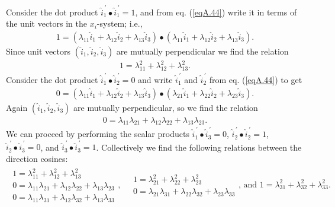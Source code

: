\documentclass{AeroStructure-ERJohnson}
\begin{document}
Consider the dot product $\hat{i}_{1}^{\,\prime} \bullet \hat{i}_{1}^{\,\prime}=1$, and from eq. (\ref{eqA.44}) write it in terms of the unit vectors in the $x_{i}$-system; i.e.,
\begin{align}\label{eqA.45}
1=(\lambda_{11} \hat{i}_{1}+\lambda_{12} \hat{i}_{2}+\lambda_{13} \hat{i}_{3}) \bullet (\lambda_{11} \hat{i}_{1}+\lambda_{12} \hat{i}_{2}+\lambda_{13} \hat{i}_{3}).
\end{align}
Since unit vectors $(\hat{i}_{1}, \hat{i}_{2}, \hat{i}_{3})$ are mutually perpendicular we find the relation
\begin{align}\label{eqA.46}	
1=\lambda_{11}^{2}+\lambda_{12}^{2}+\lambda_{13}^{2}.
\end{align}
Consider the dot product $\hat{i}_{1}^{\,\prime} \bullet \hat{i}_{2}^{\,\prime}=0$ and write $\hat{i}_{1}^{\,\prime}$ and $\hat{i}_{2}^{\,\prime}$ from eq. (\ref{eqA.44}) to get
\begin{align}\label{eqA.47}
0=(\lambda_{11} \hat{i}_{1}+\lambda_{12} \hat{i}_{2}+\lambda_{13} \hat{i}_{3}) \bullet (\lambda_{21} \hat{i}_{1}+\lambda_{22} \hat{i}_{2}+\lambda_{23} \hat{i}_{3}).
\end{align}
Again $(\hat{i}_1, \hat{i}_2, \hat{i}_3)$ are mutually perpendicular, so we find the relation
\begin{align}\label{eqA.48}
0=\lambda_{11} \lambda_{21}+\lambda_{12} \lambda_{22}+\lambda_{13} \lambda_{23}.
\end{align}
We can proceed by performing the scalar products $\hat{i}_{1}^{\,\prime} \bullet \hat{i}_{3}^{\,\prime}=0$, $\hat{i}_{2}^{\,\prime} \bullet \hat{i}_{2}^{\,\prime}=1$, $\hat{i}_{2}^{\,\prime} \bullet \hat{i}_{3}^{\,\prime}=0$, and $\hat{i}_{3}^{\,\prime} \bullet \hat{i}_{3}^{\,\prime}=1$. Collectively we find the following relations between the direction cosines:
\begin{align}\label{eqA.49}	
\begin{gathered}
1=\lambda_{11}^{2}+\lambda_{12}^{2}+\lambda_{13}^{2} \\
0=\lambda_{11} \lambda_{21}+\lambda_{12} \lambda_{22}+\lambda_{13} \lambda_{23} \\
0=\lambda_{11} \lambda_{31}+\lambda_{12} \lambda_{32}+\lambda_{13} \lambda_{33}
\end{gathered},\quad
\begin{gathered}
1=\lambda_{21}^{2}+\lambda_{22}^{2}+\lambda_{23}^{2} \\
0=\lambda_{21} \lambda_{31}+\lambda_{22} \lambda_{32}+\lambda_{23} \lambda_{33}
\end{gathered}\mbox{, and }1=\lambda_{31}^{2}+\lambda_{32}^{2}+\lambda_{33}^{2}.
\end{align}
\end{document}
